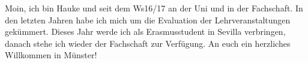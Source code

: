 \begin{multicols*}{2}
	

	



{Moin, ich bin Hauke und seit dem Ws16/17 an der Uni und in der Fachschaft.
In den letzten Jahren habe ich mich um die Evaluation der Lehrveranstaltungen gekümmert. Dieses Jahr werde ich als Erasmusstudent in Sevilla verbringen, danach stehe ich wieder der Fachschaft zur Verfügung. An euch ein herzliches Willkommen in Münster! 
	\vspace{2\baselineskip}
}


\end{multicols*}
